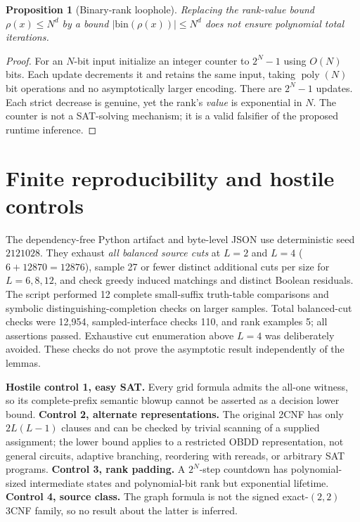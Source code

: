 \documentclass[11pt]{article}
\newtheorem{proposition}[theorem]{Proposition}
\begin{document}
\begin{proposition}[Binary-rank loophole]\label{prop:counter}
Replacing the rank-value bound $\rho(x)\le N^d$ by a bound $|\mathrm{bin}(\rho(x))|\le N^d$ does not ensure polynomial total iterations.
\end{proposition}
\begin{proof}
For an $N$-bit input initialize an integer counter to $2^N-1$ using $O(N)$ bits. Each update decrements it and retains the same input, taking $\operatorname{poly}(N)$ bit operations and no asymptotically larger encoding. There are $2^N-1$ updates. Each strict decrease is genuine, yet the rank's \emph{value} is exponential in $N$. The counter is not a SAT-solving mechanism; it is a valid falsifier of the proposed runtime inference.
\end{proof}

\section{Finite reproducibility and hostile controls}
\noindent The dependency-free Python artifact  and byte-level JSON  use deterministic seed $2121028$. They exhaust \emph{all balanced source cuts} at $L=2$ and $L=4$ ($6+12870=12876$), sample 27 or fewer distinct additional cuts per size for $L=6,8,12$, and check greedy induced matchings and distinct Boolean residuals. The script performed 12 complete small-suffix truth-table comparisons and symbolic distinguishing-completion checks on larger samples. Total balanced-cut checks were 12,954, sampled-interface checks 110, and rank examples 5; all assertions passed. Exhaustive cut enumeration above $L=4$ was deliberately avoided. These checks do not prove the asymptotic result independently of the lemmas.

\noindent \textbf{Hostile control 1, easy SAT.} Every grid formula admits the all-one witness, so its complete-prefix semantic blowup cannot be asserted as a decision lower bound. \textbf{Control 2, alternate representations.} The original 2CNF has only $2L(L-1)$ clauses and can be checked by trivial scanning of a supplied assignment; the lower bound applies to a restricted OBDD representation, not general circuits, adaptive branching, reordering with rereads, or arbitrary SAT programs. \textbf{Control 3, rank padding.} A $2^N$-step countdown has polynomial-sized intermediate states and polynomial-bit rank but exponential lifetime. \textbf{Control 4, source class.} The graph formula is not the signed exact-$(2,2)$ 3CNF family, so no result about the latter is inferred.
\end{document}
